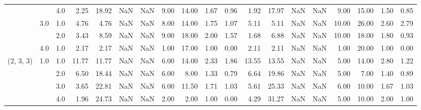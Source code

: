 \begin{tabular}{lllrrrrrrrrrrrrrrrr}
          &     & 4.0  &      2.25 &      18.92 &               NaN &                NaN &  9.00 &  14.00 &             1.67 &                         0.96 &      1.92 &      17.97 &               NaN &                NaN &  9.00 &  15.00 &             1.50 &                         0.85 \\
          & 3.0 & 1.0  &      4.76 &       4.76 &               NaN &                NaN &  8.00 &  14.00 &             1.75 &                         1.07 &      5.11 &       5.11 &               NaN &                NaN & 10.00 &  26.00 &             2.60 &                         2.79 \\
          &     & 2.0  &      3.43 &       8.59 &               NaN &                NaN &  9.00 &  18.00 &             2.00 &                         1.57 &      1.68 &       6.88 &               NaN &                NaN & 10.00 &  18.00 &             1.80 &                         0.93 \\
          & 4.0 & 1.0  &      2.17 &       2.17 &               NaN &                NaN &  1.00 &  17.00 &             1.00 &                         0.00 &      2.11 &       2.11 &               NaN &                NaN &  1.00 &  20.00 &             1.00 &                         0.00 \\
(2, 3, 3) & 1.0 & 1.0  &     11.77 &      11.77 &               NaN &                NaN &  6.00 &  14.00 &             2.33 &                         1.86 &     13.55 &      13.55 &               NaN &                NaN &  5.00 &  14.00 &             2.80 &                         1.22 \\
          &     & 2.0  &      6.50 &      18.44 &               NaN &                NaN &  6.00 &   8.00 &             1.33 &                         0.79 &      6.64 &      19.86 &               NaN &                NaN &  5.00 &   7.00 &             1.40 &                         0.89 \\
          &     & 3.0  &      3.65 &      22.81 &               NaN &                NaN &  6.00 &  11.50 &             1.71 &                         1.03 &      5.61 &      25.33 &               NaN &                NaN &  6.00 &  10.00 &             1.67 &                         1.03 \\
          &     & 4.0  &      1.96 &      24.73 &               NaN &                NaN &  2.00 &   2.00 &             1.00 &                         0.00 &      4.29 &      31.27 &               NaN &                NaN &  5.00 &  10.00 &             2.00 &                         1.00 \\

\end{tabular}
